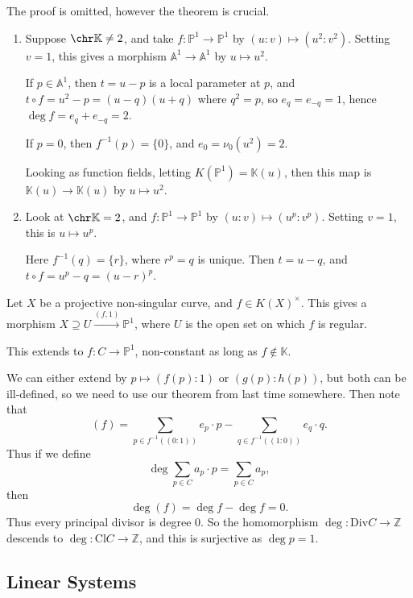 \documentclass[12pt]{article}
\begin{document}
The proof is omitted, however the theorem is crucial.

\begin{exbox}
	\begin{enumerate}[1.]
		\item Suppose $\chr \mathbb{K} \neq 2$, and take $f : \mathbb{P}^1 \to \mathbb{P}^1$ by $(u : v) \mapsto (u^2 : v^2)$. Setting $v = 1$, this gives a morphism $\mathbb{A}^1 \to \mathbb{A}^1$ by $u \mapsto u^2$.

			If $p \in \mathbb{A}^1$, then $t = u - p$ is a local parameter at $p$, and $t \circ f = u^2 - p = (u - q)(u + q)$ where $q^2 = p$, so $e_q = e_{-q} = 1$, hence $\deg f = e_q + e_{-q} = 2$.

			If $p = 0$, then $f^{-1}(p) = \{0\}$, and $e_0 = \nu_0(u^2) = 2$.

			Looking as function fields, letting $K(\mathbb{P}^1) = \mathbb{K}(u)$, then this map is $\mathbb{K}(u) \to \mathbb{K}(u)$ by $u \mapsto u^2$.
		\item Look at $\chr \mathbb{K} = 2$, and $f : \mathbb{P}^1 \to \mathbb{P}^1$ by $(u : v) \mapsto (u^p : v^p)$. Setting $v = 1$, this is $u \mapsto u^p$.

			Here $f^{-1}(q) = \{r\}$, where $r^p = q$ is unique. Then $t = u - q$, and $t \circ f= u^p - q = (u - r)^p$.
	\end{enumerate}
\end{exbox}

Let $X$ be a projective non-singular curve, and $f \in K(X)^\times$. This gives a morphism $X \supseteq U \overset{(f, 1)} \to \mathbb{P}^1$, where $U$ is the open set on which $f$ is regular.

This extends to $f : C \to \mathbb{P}^1$, non-constant as long as $f \not \in \mathbb{K}$.


We can either extend by $p \mapsto (f(p): 1)$ or  $(g(p) : h(p))$, but both can be ill-defined, so we need to use our theorem from last time somewhere. Then note that
\[
	(f) = \sum_{p \in f^{-1}((0 : 1))}e_p \cdot p - \sum_{q \in f^{-1}((1 : 0))} e_q \cdot q.
\]
Thus if we define
\[
\deg \sum_{p \in C} a_p \cdot p = \sum_{p \in C}a_p,
\]
then
\[
\deg (f) = \deg f - \deg f = 0.
\]
Thus every principal divisor is degree 0. So the homomorphism $\deg : \mathrm{Div} C \to \mathbb{Z}$ descends to $\deg : \mathrm{Cl} C \to \mathbb{Z}$, and this is surjective as $\deg p = 1$.

\subsection{Linear Systems}%
\label{sub:lin_sys}
\end{document}
